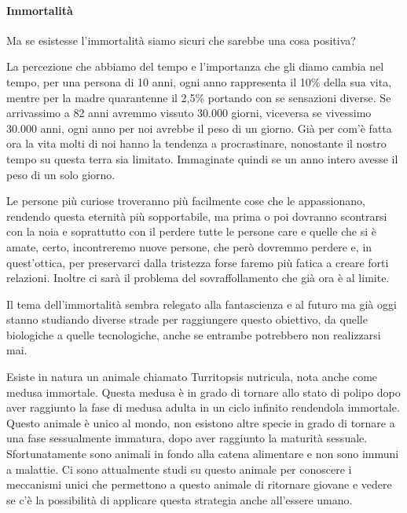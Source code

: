 \documentclass[12pt]{book} %
\begin{document}
\paragraph{Immortalità}
Ma se esistesse l'immortalità siamo sicuri che sarebbe una cosa positiva?

La percezione che abbiamo del tempo e l'importanza che gli diamo cambia nel tempo, per una persona
di 10 anni, ogni anno rappresenta il 10\% della sua vita, mentre per la madre quarantenne il 2,5\% portando con se
sensazioni diverse. Se arrivassimo a 82 anni avremmo vissuto 30.000 giorni, viceversa se vivessimo 30.000 anni, ogni
anno per noi avrebbe il peso di un giorno. Già per com'è fatta ora la vita molti di noi hanno la
tendenza a procrastinare, nonostante il nostro tempo su questa terra sia limitato. Immaginate quindi se un anno intero
avesse il peso di un solo giorno.

Le persone più curiose troveranno più facilmente cose che le appassionano, rendendo questa eternità più sopportabile, ma
prima o poi dovranno scontrarsi con la noia e soprattutto con il perdere tutte le persone care e quelle che si è amate,
certo, incontreremo nuove persone, che però dovremmo perdere e, in quest'ottica, per preservarci dalla tristezza forse faremo più fatica a creare forti relazioni. Inoltre ci sarà il problema del sovraffollamento che già ora è al limite.

Il tema dell'immortalità sembra relegato alla fantascienza e al futuro ma già oggi stanno studiando
diverse strade per raggiungere questo obiettivo, da quelle biologiche a quelle tecnologiche, anche se entrambe potrebbero non realizzarsi mai. 

Esiste in natura un animale chiamato Turritopsis nutricula, nota anche come medusa immortale. Questa medusa è in grado
di tornare allo stato di polipo dopo aver raggiunto la fase di medusa adulta in un ciclo infinito rendendola immortale.
Questo animale è unico al mondo, non esistono altre specie in grado di tornare a una fase sessualmente immatura, dopo
aver raggiunto la maturità sessuale. 
Sfortunatamente sono animali in fondo alla catena alimentare e non sono immuni a malattie. Ci sono attualmente studi su
questo animale per conoscere i meccanismi unici che permettono a questo animale di ritornare giovane e vedere se
c'è la possibilità di applicare questa strategia anche all'essere umano.
\end{document}
